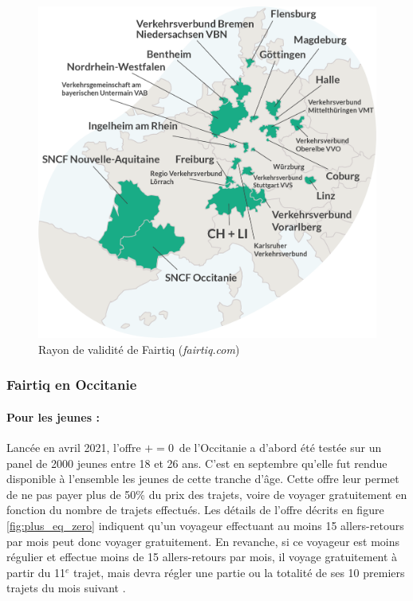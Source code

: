 \documentclass[a4paper]{article}
\begin{document}
\begin{figure}
  \centering
  \includegraphics[width=\textwidth]{illustrations/images/rayon_validite_fairtiq.png}
  \caption{\centering Rayon de validité de Fairtiq (\textit{fairtiq.com})}
  \label{fig:rayon_validite}
\end{figure}


\subsubsection{Fairtiq en Occitanie}
\paragraph{Pour les jeunes : }

Lancée en avril 2021, l'offre \og $+=0$\fg\ de l'Occitanie a d'abord été testée sur un panel de 2000 jeunes entre 18 et 26 ans.
C'est en septembre qu'elle fut rendue disponible à l'ensemble les jeunes de cette tranche
d'âge.  Cette offre leur permet de ne pas payer plus de 50\% du prix des trajets,
voire de voyager gratuitement en fonction du nombre de trajets effectués.
Les détails de l'offre décrits en figure \ref*{fig:plus_eq_zero} indiquent qu'un voyageur effectuant
au moins 15 allers-retours par mois peut donc voyager gratuitement. En revanche, si ce voyageur est moins régulier
et effectue moins de 15 allers-retours par mois, il voyage gratuitement à partir du 11$^{e}$ trajet, mais
devra régler une partie ou la totalité de ses 10 premiers trajets du
mois suivant \cite{plus_eq_zero}.
\end{document}
